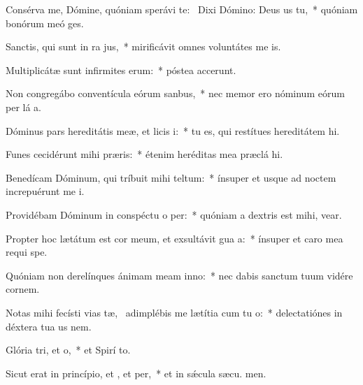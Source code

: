 \item Consérva me, Dómine, quóniam sperávi  te:~\pscross{} Dixi Dómino: Deus us  tu,~* quóniam bonórum meó  ges.
\item Sanctis, qui sunt in ra jus,~* mirificávit omnes voluntátes me  is.
\item Multiplicátæ sunt infirmites erum:~* póstea accerunt.
\item Non congregábo conventícula eórum  sanbus,~* nec memor ero nóminum eórum per lá a.
\item Dóminus pars hereditátis meæ, et licis i:~* tu es, qui restítues hereditátem  hi.
\item Funes cecidérunt mihi  præris:~* étenim heréditas mea præclá  hi.
\item Benedícam Dóminum, qui tríbuit mihi teltum:~* ínsuper et usque ad noctem increpuérunt me  i.
\item Providébam Dóminum in conspéctu o per:~* quóniam a dextris est mihi,  vear.
\item Propter hoc lætátum est cor meum, et exsultávit gua a:~* ínsuper et caro mea requi  spe.
\item Quóniam non derelínques ánimam meam  inno:~* nec dabis sanctum tuum vidére cornem.
\item Notas mihi fecísti vias tæ,~\pscross{} adimplébis me lætítia cum tu o:~* delectatiónes in déxtera tua us  nem.
\item Glória tri, et o,~* et Spirí to.
\item Sicut erat in princípio, et , et per,~* et in sǽcula sæcu. men.
